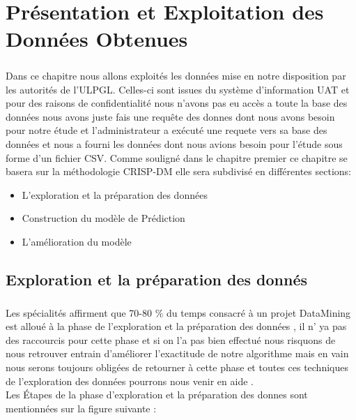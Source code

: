 \chapter{Présentation et Exploitation des Données Obtenues}
\paragraph{}
 Dans ce chapitre nous allons exploités les données mise en notre
disposition par les autorités de l'\ac{ULPGL}. Celles-ci sont issues du
système d'information \ac{UAT}  et pour des
raisons de confidentialité nous n'avons pas eu accès a toute la base des
données nous avons juste fais une requête des donnes dont nous avons
besoin pour notre étude et l'administrateur a exécuté une requete vers
sa base des données et nous a fourni les données dont nous avions besoin
pour l'étude sous forme d'un fichier \ac {CSV}. Comme
souligné dans le chapitre premier ce chapitre se basera sur la
méthodologie \ac{CRISP-DM} elle sera subdivisé en différentes sections:
\begin{itemize}
	\item L'exploration et la préparation des données 
	\item  Construction du modèle de Prédiction  
	\item  L'amélioration du modèle  \cite{bookSckit-Learn}
\end{itemize}


    \section{Exploration et la préparation des donnés}
\paragraph{}
Les spécialités affirment que 70-80 \% du temps consacré à un projet
DataMining est alloué à la phase de l'exploration et la préparation des
données \cite{DataExpAV} , il n' ya pas des raccourcis pour cette phase et si on l'a pas
bien effectué nous risquons de nous retrouver entrain d'améliorer
l'exactitude de notre algorithme mais en vain nous serons toujours
obligées de retourner à cette phase et toutes ces techniques de
l'exploration des données pourrons nous venir en aide .\\
Les Étapes de la phase d'exploration et la préparation des donnes sont mentionnées sur la figure suivante :
